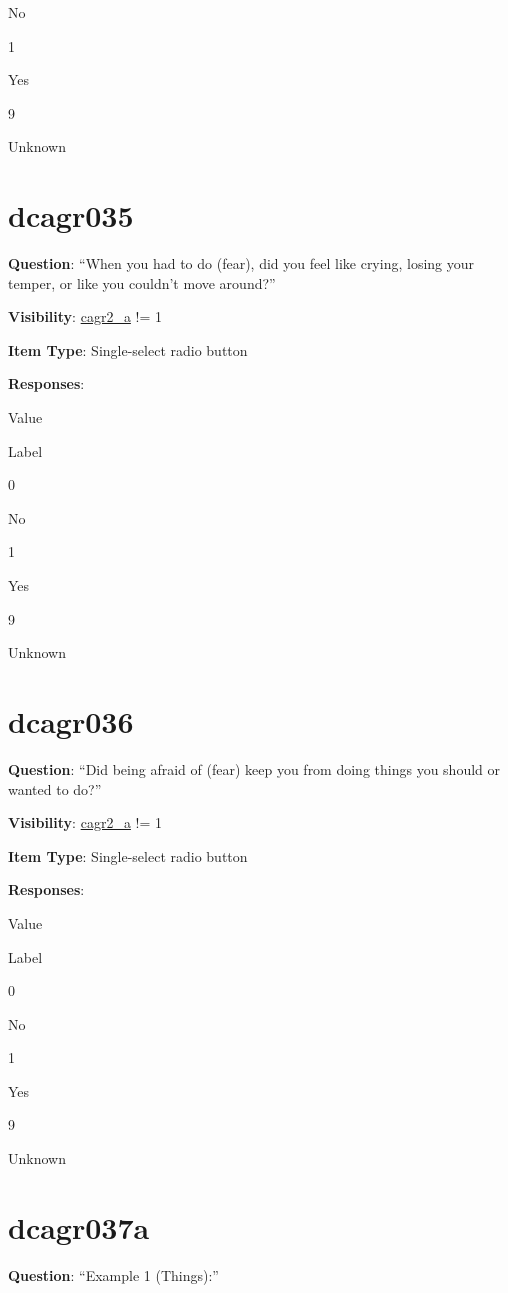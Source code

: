 \documentclass[]{book}
\begin{document}
No

1

Yes

9

Unknown

\hypertarget{dcagr035}{%
\section{dcagr035}\label{dcagr035}}

\textbf{Question}: ``When you had to do (fear), did you feel like crying, losing your temper, or like you couldn't move around?''

\textbf{Visibility}: \protect\hyperlink{cagr2_a}{cagr2\_a} != 1

\textbf{Item Type}: Single-select radio button

\textbf{Responses}:

Value

Label

0

No

1

Yes

9

Unknown

\hypertarget{dcagr036}{%
\section{dcagr036}\label{dcagr036}}

\textbf{Question}: ``Did being afraid of (fear) keep you from doing things you should or wanted to do?''

\textbf{Visibility}: \protect\hyperlink{cagr2_a}{cagr2\_a} != 1

\textbf{Item Type}: Single-select radio button

\textbf{Responses}:

Value

Label

0

No

1

Yes

9

Unknown

\hypertarget{dcagr037a}{%
\section{dcagr037a}\label{dcagr037a}}

\textbf{Question}: ``Example 1 (Things):''
\end{document}
